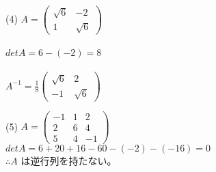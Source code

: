 \documentclass[fleqn]{jsarticle}
\begin{document}
\begin{description}
\begin{spacing}{1.2}
            \item[(4)]
                $ A =
                \left(
                    \begin{array}{cc}
                        \sqrt{6} & -2 \\
                        1 & \sqrt{6}
                    \end{array}
                \right) $ \\\\
                $ detA = 6 - (-2) = 8 $ \\\\
                $ A^{-1} =
                \frac{1}{8} \left(
                    \begin{array}{cc}
                        \sqrt{6} & 2 \\
                        -1 & \sqrt{6}
                    \end{array}
                \right) $

            \item[(5)]
                $ A =
                \left(
                    \begin{array}{ccc}
                        -1 & 1 & 2 \\
                        2 & 6 & 4 \\
                        5 & 4 & -1
                    \end{array}
                \right) $ \\
                $ detA = 6 + 20 + 16 - 60 - (-2) - (-16) = 0 $ \\
                $ \therefore A $ は逆行列を持たない。


\end{spacing}
\end{description}
\end{document}
